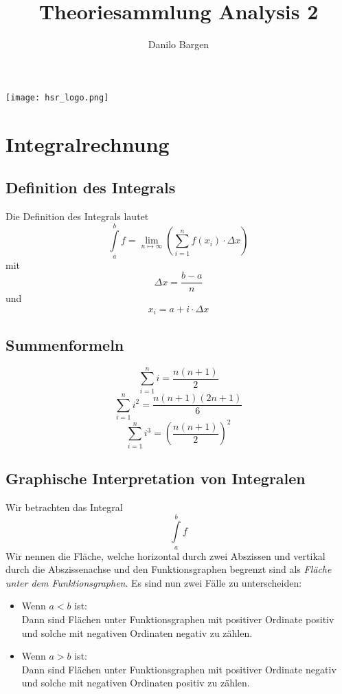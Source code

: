\documentclass[10pt,a4paper]{scrartcl}
\author{Danilo Bargen}
\title{Theoriesammlung Analysis 2}
\begin{document}
\begin{titlepage}
	\maketitle
	\vspace{120mm}
	\center\texttt{[image: hsr\_logo.png]}
	\thispagestyle{empty} %
\end{titlepage}

\tableofcontents\newpage


\section{Integralrechnung}


\subsection{Definition des Integrals}

Die Definition des Integrals lautet
$$\int\limits_a^b f = \lim_{n \mapsto \infty}\left(\sum_{i=1}^n f(x_i) \cdot
    \Delta x\right)$$
mit
$$\Delta x = \frac{b-a}{n}$$
und
$$x_i = a + i \cdot \Delta x$$


\subsection{Summenformeln}

$$\sum_{i=1}^n i = \frac{n(n+1)}{2}$$
$$\sum_{i=1}^n i^2 = \frac{n(n+1)(2n+1)}{6}$$
$$\sum_{i=1}^n i^3 = \left(\frac{n(n+1)}{2}\right)^2$$


\subsection{Graphische Interpretation von Integralen}

Wir betrachten das Integral
$$\int\limits_a^b f$$
Wir nennen die Fläche, welche horizontal durch zwei Abszissen und vertikal
durch die Abszissenachse und den Funktionsgraphen begrenzt sind als
\emph{Fläche unter dem Funktionsgraphen}. Es sind nun zwei Fälle zu
unterscheiden:

\begin{itemize}
    \item Wenn $a < b$ ist:\\
    Dann sind Flächen unter Funktionsgraphen mit positiver Ordinate positiv und
    solche mit negativen Ordinaten negativ zu zählen.
    \item Wenn $a > b$ ist:\\
    Dann sind Flächen unter Funktionsgraphen mit positiver Ordinate negativ und
    solche mit negativen Ordinaten positiv zu zählen.
\end{itemize}
\end{document}
